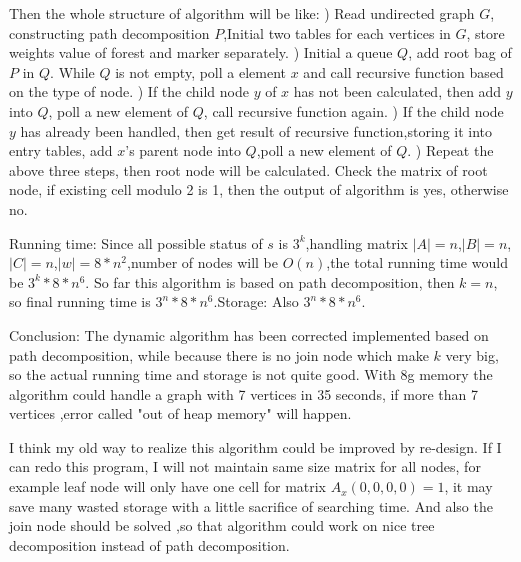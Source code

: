 Then the whole structure of algorithm will be like:
) Read undirected graph $G$, constructing path decomposition $P$,Initial two tables for each vertices in $G$, store weights value of forest and marker separately.
) Initial a queue $Q$, add root bag of $P$ in $Q$. While $Q$ is not empty, poll a element $x$ and call recursive function based on the type of node.
) If the child node $y$ of $x$ has not been calculated, then add $y$ into $Q$, poll a new element of $Q$, call recursive function again.
) If the child node $y$ has already been handled, then get result of recursive function,storing it into entry tables, add $x$'s parent node into $Q$,poll a new element of $Q$.
) Repeat the above three steps, then root node will be calculated. Check the matrix of root node, if existing cell modulo 2 is 1, then the output of algorithm is yes, otherwise no.

\noindent Running time:
Since all possible status of $s$ is $3^k$,handling matrix $|A|=n$,$|B|=n$,$|C|=n$,$|w|=8*n^2$,number of nodes will be $O(n)$,the total running time would be $3^k*8*n^6$. So far this algorithm is based on path decomposition, then $k=n$, so final running time is $3^n*8*n^6$.Storage: Also $3^n*8*n^6$.

\noindent Conclusion:
The dynamic algorithm has been corrected implemented based on path decomposition, while because there is no join node which make $k$ very big, so the actual running time and storage is not quite good. With 8g memory the algorithm could handle a graph with 7 vertices in 35 seconds, if more than 7 vertices ,error called "out of heap memory" will happen.

\noindent I think my old way to realize this algorithm could be improved by re-design. If I can redo this program, I will not maintain same size matrix for all nodes, for example leaf node will only have one cell for matrix $A_x(0,0,0,0)=1$, it may save many wasted storage with a little sacrifice of searching time. And also the join node should be solved ,so that algorithm could work on nice tree decomposition instead of path decomposition.


